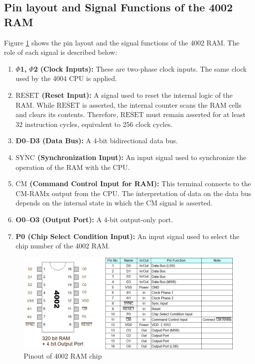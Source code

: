 \subsection{Pin layout and Signal Functions of the 4002 RAM}
Figure \ref{fig:PINOUT4002} shows the pin layout and the signal functions of the 4002 RAM. The role of each signal is described below:

\begin{enumerate}[\textbf{(\arabic*)}]
  \item \textbf{$\Phi$1, $\Phi$2 (Clock Inputs):}  
    These are two-phase clock inputs. The same clock used by the 4004 CPU is applied.

  \item \textbf{$\overline{\text{RESET}}$ (Reset Input):}  
    A signal used to reset the internal logic of the RAM. While $\overline{\text{RESET}}$ is asserted, the internal counter scans the RAM cells and clears its contents. Therefore, $\overline{\text{RESET}}$ must remain asserted for at least 32 instruction cycles, equivalent to 256 clock cycles.

  \item \textbf{D0--D3 (Data Bus):}  
    A 4-bit bidirectional data bus.

  \item \textbf{$\overline{\text{SYNC}}$ (Synchronization Input):}  
    An input signal used to synchronize the operation of the RAM with the CPU.

  \item \textbf{$\overline{\text{CM}}$ (Command Control Input for RAM):}  
    This terminal connects to the $\overline{\text{CM-RAMx}}$ output from the CPU. The interpretation of data on the data bus depends on the internal state in which the $\overline{\text{CM}}$ signal is asserted.

  \item \textbf{O0--O3 (Output Port):}  
    A 4-bit output-only port.

  \item \textbf{P0 (Chip Select Condition Input):}  
    An input signal used to select the chip number of the 4002 RAM.
\end{enumerate}

\begin{figure}
    \includegraphics[width=1.0\columnwidth]{./Figure/Pinout4002.png}
    \caption{Pinout of 4002 RAM chip}
    \label{fig:PINOUT4002}
\end{figure}

